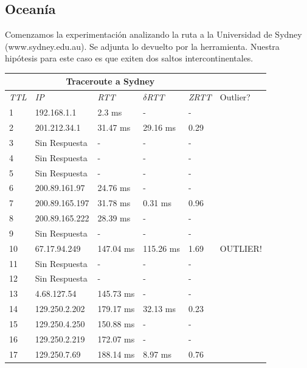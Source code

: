 \subsection{Oceanía}

Comenzamos la experimentación analizando la ruta a la Universidad de Sydney (www.sydney.edu.au). Se adjunta lo devuelto por la herramienta. Nuestra hipótesis para este caso es que exiten dos saltos intercontinentales. \\

\begin{tabular}{ |p{1cm}||p{3cm}|p{2cm}|p{2cm}|p{2cm}|p{1.5cm}|  }
 \hline
 \multicolumn{5}{|c|}{Traceroute a Sydney} \\
 \hline
 \textit{TTL} & \textit{IP}  & \textit{RTT} & $\delta$\textit{RTT}&\textit{ZRTT} & Outlier? \\
 \hline
1 &  192.168.1.1  &  2.3 ms  & - & - \\    
2 &  201.212.34.1   & 31.47 ms &  29.16 ms    &     0.29    & \\  
3  &  Sin Respuesta  &  -   &   -    &   -  & \\   
4   & Sin Respuesta  &  -   &   -   &    -  & \\ 
5    & Sin Respuesta  & -    &   -   &    -    & \\ 
6  &  200.89.161.97  & 24.76 ms &  -    &   -    & \\ 
7   & 200.89.165.197 & 31.78 ms &  0.31 ms    &      0.96     & \\ 
8   & 200.89.165.222 & 28.39 ms &  -    &      -        & \\ 
9   & Sin Respuesta  &  -    &   -   &      -       & \\ 
10  & 67.17.94.249   & 147.04 ms & 115.26 ms   &     1.69     &         OUTLIER! \\
11  & Sin Respuesta  &  -   &   -   &      -       & \\  
12  & Sin Respuesta  &  -  &   -    &       -      & \\ 
13  & 4.68.127.54    & 145.73 ms &  -           &     -        & \\ 
14  & 129.250.2.202  & 179.17 ms &    32.13 ms   &      0.23    & \\ 
15  & 129.250.4.250  & 150.88 ms &   -           &     -        & \\ 
16  & 129.250.2.219  & 172.07 ms &   -           &     -        & \\ 
17  & 129.250.7.69   & 188.14 ms &   8.97 ms    &      0.76     & \\ 

\end{tabular}
